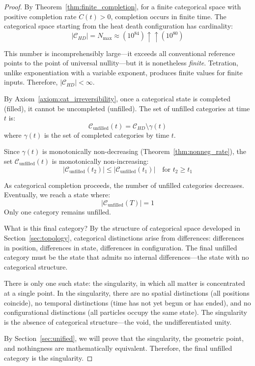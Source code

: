 \documentclass[12pt,a4paper]{article}
\theoremstyle{definition}
\theoremstyle{remark}
\newcommand{\Nmax}{N_{\text{max}}}
\begin{document}
\begin{proof}
By Theorem~\ref{thm:finite_completion}, for a finite categorical space with positive completion rate $\dot{C}(t) > 0$, completion occurs in finite time. The categorical space starting from the heat death configuration has cardinality:
\begin{equation}
|\mathcal{C}_{HD}| = \Nmax \approx (10^{84}) \uparrow\uparrow (10^{80})
\end{equation}

This number is incomprehensibly large—it exceeds all conventional reference points to the point of universal nullity—but it is nonetheless \emph{finite}. Tetration, unlike exponentiation with a variable exponent, produces finite values for finite inputs. Therefore, $|\mathcal{C}_{HD}| < \infty$.

By Axiom~\ref{axiom:cat_irreversibility}, once a categorical state is completed (filled), it cannot be uncompleted (unfilled). The set of unfilled categories at time $t$ is:
\begin{equation}
\mathcal{C}_{\text{unfilled}}(t) = \mathcal{C}_{HD} \setminus \gamma(t)
\end{equation}
where $\gamma(t)$ is the set of completed categories by time $t$.

Since $\gamma(t)$ is monotonically non-decreasing (Theorem~\ref{thm:nonneg_rate}), the set $\mathcal{C}_{\text{unfilled}}(t)$ is monotonically non-increasing:
\begin{equation}
|\mathcal{C}_{\text{unfilled}}(t_2)| \leq |\mathcal{C}_{\text{unfilled}}(t_1)| \quad \text{for } t_2 \geq t_1
\end{equation}

As categorical completion proceeds, the number of unfilled categories decreases. Eventually, we reach a state where:
\begin{equation}
|\mathcal{C}_{\text{unfilled}}(T)| = 1
\end{equation}
Only one category remains unfilled.

What is this final category? By the structure of categorical space developed in Section~\ref{sec:topology}, categorical distinctions arise from differences: differences in position, differences in state, differences in configuration. The final unfilled category must be the state that admits no internal differences—the state with no categorical structure.

There is only one such state: the singularity, in which all matter is concentrated at a single point. In the singularity, there are no spatial distinctions (all positions coincide), no temporal distinctions (time has not yet begun or has ended), and no configurational distinctions (all particles occupy the same state). The singularity is the absence of categorical structure—the void, the undifferentiated unity.

By Section~\ref{sec:unified}, we will prove that the singularity, the geometric point, and nothingness are mathematically equivalent. Therefore, the final unfilled category is the singularity.
\end{proof}
\end{document}
